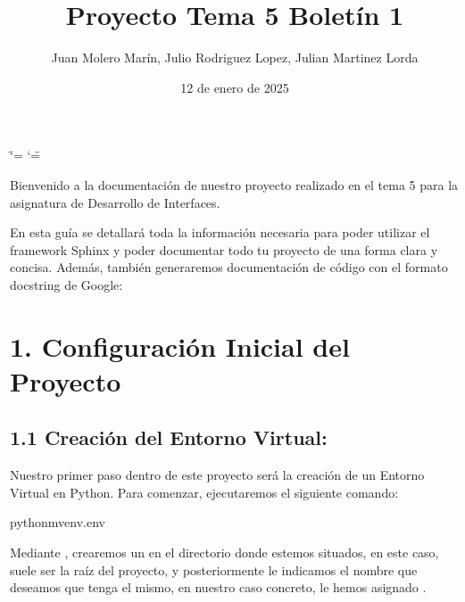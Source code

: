 \documentclass[a4paper,10pt,spanish]{sphinxmanual}
\title{Proyecto Tema 5 Boletín 1}
\date{12 de enero de 2025}
\author{Juan Molero Marín, Julio Rodriguez Lopez, Julian Martinez Lorda}
\begin{document}
\ifdefined\shorthandoff
  \ifnum\catcode`\=\string=\active\shorthandoff{=}\fi
  \ifnum\catcode`\"=\active{}\fi
\fi

\pagestyle{empty}
\maketitle\newpage
\pagestyle{plain}

\pagestyle{normal}
\label{\detokenize{index::doc}}


\sphinxAtStartPar
Bienvenido a la documentación de nuestro proyecto realizado en el tema 5 para la asignatura de Desarrollo de Interfaces.

\sphinxAtStartPar
En esta guía se detallará toda la información necesaria para poder utilizar el framework Sphinx y poder documentar todo tu proyecto de una forma clara y concisa. Además, también generaremos documentación de código con el formato docstring de Google:

\sphinxstepscope


\chapter{1. Configuración Inicial del Proyecto}
\label{\detokenize{1_configuracion_inicial/index:configuracion-inicial-del-proyecto}}\label{\detokenize{1_configuracion_inicial/index::doc}}
\sphinxstepscope


\section{1.1 Creación del Entorno Virtual:}
\label{\detokenize{1_configuracion_inicial/entorno:creacion-del-entorno-virtual}}\label{\detokenize{1_configuracion_inicial/entorno::doc}}
\sphinxAtStartPar
Nuestro primer paso dentro de este proyecto será la creación de un Entorno Virtual en Python. Para comenzar, ejecutaremos el siguiente comando:

\begin{sphinxVerbatim}[commandchars=\\\{\}]
python\PYGZhy{}mvenv.env
\end{sphinxVerbatim}

\sphinxAtStartPar
Mediante , crearemos un  en el directorio donde estemos situados, en este caso, suele ser la raíz del proyecto, y posteriormente le indicamos el nombre que deseamos que tenga el mismo, en nuestro caso concreto, le hemos asignado .
\end{document}
